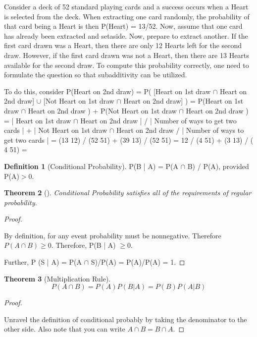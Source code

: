 \documentclass[10pt,]{book}
\theoremstyle{plain}
\newtheorem{theorem}{Theorem}[section]
\theoremstyle{definition}
\newtheorem{definition}[theorem]{Definition}
\theoremstyle{definition}
\theoremstyle{definition}
\numberwithin{equation}{section}
\newcommand{\gt}{ > }
\begin{document}
	Consider a deck of 52 standard playing cards and a success occurs when a Heart is selected from the deck. When extracting one card randomly, the probability	of that card being a Heart is then P(Heart) = 13/52. Now, assume that one card has already been extracted and setaside.  Now, prepare to extract another. If the first card drawn was a Heart, then there are only 12 Hearts left for the second draw. However, if the first card drawn was not a Heart, then there are 13 Hearts available for the second draw. To compute this probability correctly, one need to formulate the question so that subadditivity can  be utilized.%
\par

	To do this, consider 
	P(Heart on 2nd draw) 
	= P( [Heart on 1st draw \(\cap\) Heart on 2nd draw] \(\cup\) [Not Heart on 1st draw \(\cap\) Heart on 2nd draw] )
	= P(Heart on 1st draw \(\cap\) Heart on 2nd draw ) + P(Not Heart on 1st draw \(\cap\) Heart on 2nd draw )
	= | Heart on 1st draw \(\cap\) Heart on 2nd draw | / | Number of ways to get two cards |
	+ | Not Heart on 1st draw \(\cap\) Heart on 2nd draw / | Number of ways to get two cards |
	= (13 12) / (52 51) + (39 13) / (52 51) = 12 / (4 51) + (3 13) / ( 4 51) =  

\begin{definition}[Conditional Probability]\label{definition-23}
P(B | A) = P(A \(\cap\) B) / P(A), provided P(A)\(\gt 0\).\end{definition}
\begin{theorem}[]\label{theorem-23}
Conditional Probability satisfies all of the requirements of regular probability.\end{theorem}
\begin{proof}\hypertarget{proof-18}{}

		By definition, for any event probability must be nonnegative. Therefore
		\(P(A \cap B) \ge 0\).  Therefore, P(B | A) \(\ge 0\).
\par

		Further, P (S | A) = P(A \(\cap\) S)/P(A) = P(A)/P(A) = 1.
\end{proof}
\begin{theorem}[Multiplication Rule]\label{theorem-24}
\begin{equation*}P(A \cap B) = P(A) P(B | A) = P(B) P(A | B)\end{equation*}\end{theorem}
\begin{proof}\hypertarget{proof-19}{}

		Unravel the definition of conditional probably by taking the denominator to the other side. Also note that you can write \(A \cap B = B \cap A\).
\end{proof}
\typeout{************************************************}
\typeout{************************************************}
\end{document}
